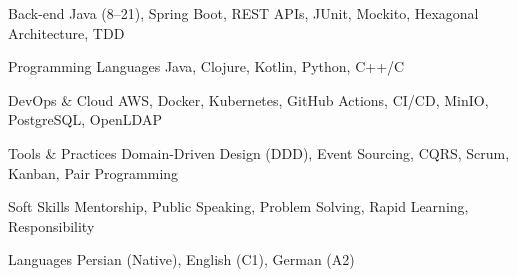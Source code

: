
\begin{cvskills}

  \cvskill
    {Back-end} 
    {Java (8–21), Spring Boot, REST APIs, JUnit, Mockito, Hexagonal Architecture, TDD} 

  \cvskill
    {Programming Languages} 
    {Java, Clojure, Kotlin, Python, C++/C}

  \cvskill
    {DevOps \& Cloud} 
    {AWS, Docker, Kubernetes, GitHub Actions, CI/CD, MinIO, PostgreSQL, OpenLDAP} 

  \cvskill
    {Tools \& Practices} 
    {Domain-Driven Design (DDD), Event Sourcing, CQRS, Scrum, Kanban, Pair Programming} 

  \cvskill
    {Soft Skills} 
    {Mentorship, Public Speaking, Problem Solving, Rapid Learning, Responsibility}

  \cvskill
    {Languages} 
    {Persian (Native), English (C1), German (A2)}

\end{cvskills}
